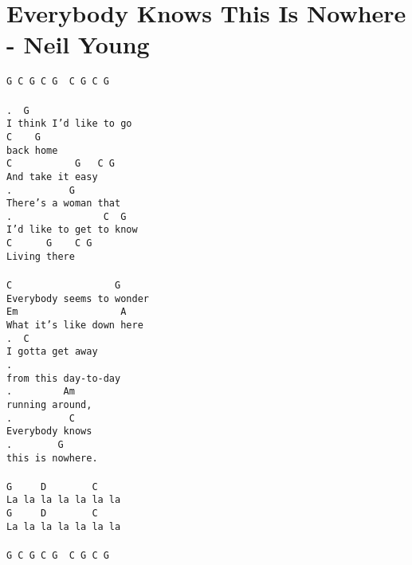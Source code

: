 \newpage
\section{Everybody Knows This Is Nowhere - Neil Young}
\label{Everybody Knows This Is Nowhere - Neil Young}
\texttt{G\ C\ G\ C\ G\ \ C\ G\ C\ G\\
\\
.\ \ G\ \ \ \ \ \ \ \\
I\ think\ I'd\ like\ to\ go\\
C\ \ \ \ G\\
back\ home\\
C\ \ \ \ \ \ \ \ \ \ \ G\ \ \ C\ G\\
And\ take\ it\ easy\\
.\ \ \ \ \ \ \ \ \ \ G\ \ \ \ \\
There's\ a\ woman\ that\\
.\ \ \ \ \ \ \ \ \ \ \ \ \ \ \ \ C\ \ G\\
I'd\ like\ to\ get\ to\ know\\
C\ \ \ \ \ \ G\ \ \ \ C\ G\\
Living\ there\\
\\
C\ \ \ \ \ \ \ \ \ \ \ \ \ \ \ \ \ \ G\\
Everybody\ seems\ to\ wonder\\
Em\ \ \ \ \ \ \ \ \ \ \ \ \ \ \ \ \ \ A\\
What\ it's\ like\ down\ here\\
.\ \ C\\
I\ gotta\ get\ away\\
.\ \ \ \ \ \ \ \ \ \ \ \ \\
from\ this\ day-to-day\\
.\ \ \ \ \ \ \ \ \ Am\\
running\ around,\\
.\ \ \ \ \ \ \ \ \ \ C\ \ \ \\
Everybody\ knows\\
.\ \ \ \ \ \ \ \ G\ \ \ \ \ \ \ \ \ \ \\
this\ is\ nowhere.\\
\\
G\ \ \ \ \ D\ \ \ \ \ \ \ \ C\\
La\ la\ la\ la\ la\ la\ la\\
G\ \ \ \ \ D\ \ \ \ \ \ \ \ C\\
La\ la\ la\ la\ la\ la\ la\\
\\
G\ C\ G\ C\ G\ \ C\ G\ C\ G\\
}
